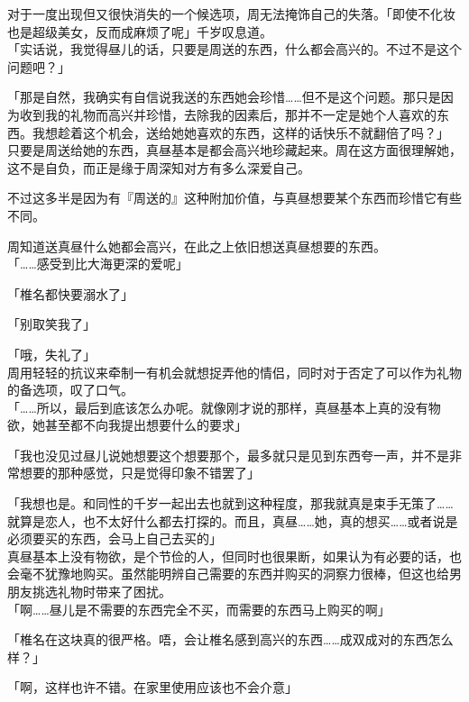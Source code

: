 对于一度出现但又很快消失的一个候选项，周无法掩饰自己的失落。「即使不化妆也是超级美女，反而成麻烦了呢」千岁叹息道。\\

「实话说，我觉得昼儿的话，只要是周送的东西，什么都会高兴的。不过不是这个问题吧？」

「那是自然，我确实有自信说我送的东西她会珍惜……但不是这个问题。那只是因为收到我的礼物而高兴并珍惜，去除我的因素后，那并不一定是她个人喜欢的东西。我想趁着这个机会，送给她她喜欢的东西，这样的话快乐不就翻倍了吗？」\\

只要是周送给她的东西，真昼基本是都会高兴地珍藏起来。周在这方面很理解她，这不是自负，而正是缘于周深知对方有多么深爱自己。

不过这多半是因为有『周送的』这种附加价值，与真昼想要某个东西而珍惜它有些不同。

周知道送真昼什么她都会高兴，在此之上依旧想送真昼想要的东西。\\

「……感受到比大海更深的爱呢」

「椎名都快要溺水了」

「别取笑我了」

「哦，失礼了」\\

周用轻轻的抗议来牵制一有机会就想捉弄他的情侣，同时对于否定了可以作为礼物的备选项，叹了口气。\\

「……所以，最后到底该怎么办呢。就像刚才说的那样，真昼基本上真的没有物欲，她甚至都不向我提出想要什么的要求」

「我也没见过昼儿说她想要这个想要那个，最多就只是见到东西夸一声，并不是非常想要的那种感觉，只是觉得印象不错罢了」

「我想也是。和同性的千岁一起出去也就到这种程度，那我就真是束手无策了……就算是恋人，也不太好什么都去打探的。而且，真昼……她，真的想买……或者说是必须要买的东西，会马上自己去买的」\\

真昼基本上没有物欲，是个节俭的人，但同时也很果断，如果认为有必要的话，也会毫不犹豫地购买。虽然能明辨自己需要的东西并购买的洞察力很棒，但这也给男朋友挑选礼物时带来了困扰。\\

「啊……昼儿是不需要的东西完全不买，而需要的东西马上购买的啊」

「椎名在这块真的很严格。唔，会让椎名感到高兴的东西……成双成对的东西怎么样？」

「啊，这样也许不错。在家里使用应该也不会介意」

